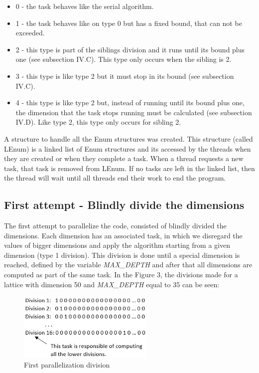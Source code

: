 \documentclass[conference]{IEEEtran}
\begin{document}
\begin{itemize}
\item 0 - the task behaves like the serial algorithm.
\item 1 - the task behaves like on type 0 but has a fixed bound, that can not be exceeded.
\item 2 - this type is part of the siblings division and it runs until its bound plus one (see subsection IV.C). This type only occurs when the sibling is 2.
\item 3 - this type is like type 2 but it must stop in its bound (see subsection IV.C).
\item 4 - this type is like type 2 but, instead of running until its bound plus one, the dimension that the task stops running must be calculated (see subsection IV.D). Like type 2, this type only occurs for sibling 2.
\end{itemize}

A structure to handle all the Enum structures was created. This structure (called LEnum) is a linked list of Enum structures and its accessed by the threads when they are created or when they complete a task. When a thread requests a new task, that task is removed from LEnum. If no tasks are left in the linked list, then the thread will wait until all threads end their work to end the program.


\subsection{First attempt - Blindly divide the dimensions}
The first attempt to parallelize the code, consisted of blindly divided the dimensions. Each dimension has an associated task, in which we disregard the values of bigger dimensions and apply the algorithm starting from a given dimension (type 1 division). This division is done until a special dimension is reached, defined by the variable \emph{MAX\_DEPTH} and after that all dimensions are computed as part of the same task. 
In the Figure 3, the divisions made for a lattice with dimension 50 and \emph{MAX\_DEPTH} equal to 35 can be seen:

\begin{figure}[ht!]
\centering
\includegraphics[width=65mm]{imgParallel/PrimeiraParalelizacao}
\caption{First parallelization division}
\end{figure}
\end{document}
